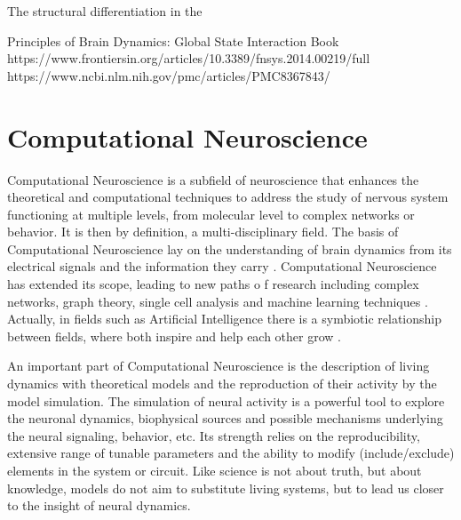 The structural differentiation in the 




Principles of Brain Dynamics: Global State Interaction Book
https://www.frontiersin.org/articles/10.3389/fnsys.2014.00219/full
https://www.ncbi.nlm.nih.gov/pmc/articles/PMC8367843/


\section{Computational Neuroscience}
Computational Neuroscience is a subfield of neuroscience that enhances the theoretical and computational techniques to address the study of nervous system functioning at multiple levels, from molecular level to complex networks or behavior. It is then by definition, a multi-disciplinary field. The basis of Computational Neuroscience lay on the understanding of brain dynamics from its electrical signals and the information they carry \parencite{schwiening_brief_2012,catterall_hodgkin-huxley_2012,dimitrov_information_2011,shannon_mathematical_1948}. Computational Neuroscience has extended its scope, leading to new paths o	f research including complex networks, graph theory, single cell analysis and machine learning techniques \parencite{cns2023}. Actually, in fields such as Artificial Intelligence there is a symbiotic relationship between fields, where both inspire and help each other grow \parencite{wozniak_deep_2020,goncalves_training_2020}.

An important part of Computational Neuroscience is the description of living dynamics with theoretical models and the reproduction of their activity by the model simulation. The simulation of neural activity is a powerful tool to explore the neuronal dynamics, biophysical sources and possible mechanisms underlying the neural signaling, behavior, etc. Its strength relies on the reproducibility, extensive range of tunable parameters and the ability to modify (include/exclude) elements in the system or circuit. Like science is not about truth, but about knowledge, models do not aim to substitute living systems, but to lead us closer to the insight of neural dynamics. %

